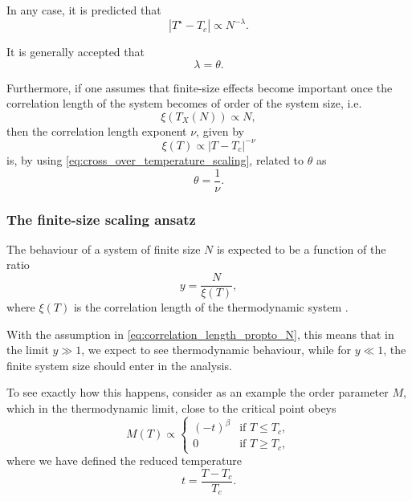 In any case, it is predicted that
\begin{equation}\label{eq:scaling_law_T_star}
  |T^{\star} - T_c| \propto N^{-\lambda}.
\end{equation}

It is generally accepted that \cite{barber1983finite}
\begin{equation}
  \lambda = \theta.
\end{equation}

Furthermore, if one assumes that finite-size effects become important once the correlation length of the system becomes of order of the system size, i.e. \cite{fisher1967interfacial}
\begin{equation}\label{eq:correlation_length_propto_N}
  \xi(T_X(N)) \propto N,
\end{equation}
then the correlation length exponent $\nu$, given by
\begin{equation}
  \xi(T) \propto |T - T_c|^{-\nu}
\end{equation}
is, by using \autoref{eq:cross_over_temperature_scaling}, related to $\theta$ as
\begin{equation}
  \theta = \frac{1}{\nu}.
\end{equation}

\subsubsection{The finite-size scaling ansatz}

The behaviour of a system of finite size $N$ is expected to be a function of the ratio
\begin{equation}
  y = \frac{N}{\xi(T)},
\end{equation}
where $\xi(T)$ is the correlation length of the thermodynamic system \cite{fisher1972scaling}.


With the assumption in \autoref{eq:correlation_length_propto_N}, this means that in the limit $y \gg 1$,
we expect to see thermodynamic behaviour, while for $y \ll 1$,
the finite system size should enter in the analysis.

To see exactly how this happens, consider as an example the order parameter $M$,
which in the thermodynamic limit, close to the critical point obeys
\begin{equation}
  M(T) \propto
  \begin{cases}
    (-t)^{\beta} & \text{if } T \leq T_c, \\
    0 & \text{if } T \geq T_c,
  \end{cases}
\end{equation}
where we have defined the reduced temperature
\begin{equation}
  t = \frac{T - T_c}{T_c}.
\end{equation}

